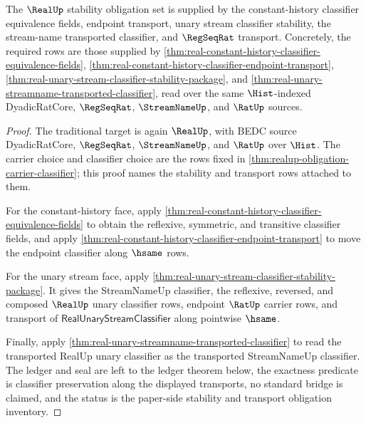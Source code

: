 \begin{theorem}
\label{thm:realup-obligation-stability-transport}
The $\RealUp$ stability obligation set is supplied by the
constant-history classifier equivalence fields, endpoint transport, unary
stream classifier stability, the stream-name transported classifier, and
$\RegSeqRat$ transport. Concretely, the required rows are those supplied by
\autoref{thm:real-constant-history-classifier-equivalence-fields},
\autoref{thm:real-constant-history-classifier-endpoint-transport},
\autoref{thm:real-unary-stream-classifier-stability-package}, and
\autoref{thm:real-unary-streamname-transported-classifier}, read over the
same $\Hist$-indexed DyadicRatCore, $\RegSeqRat$, $\StreamNameUp$, and
$\RatUp$ sources.
\end{theorem}
\begin{proof}
The traditional target is again $\RealUp$, with BEDC source
DyadicRatCore, $\RegSeqRat$, $\StreamNameUp$, and $\RatUp$ over $\Hist$.
The carrier choice and classifier choice are the rows fixed in
\autoref{thm:realup-obligation-carrier-classifier}; this proof names the
stability and transport rows attached to them.

For the constant-history face, apply
\autoref{thm:real-constant-history-classifier-equivalence-fields} to obtain
the reflexive, symmetric, and transitive classifier fields, and apply
\autoref{thm:real-constant-history-classifier-endpoint-transport} to move the
endpoint classifier along $\hsame$ rows.

For the unary stream face, apply
\autoref{thm:real-unary-stream-classifier-stability-package}. It gives the
StreamNameUp classifier, the reflexive, reversed, and composed
$\RealUp$ unary classifier rows, endpoint $\RatUp$ carrier rows, and
transport of $\mathsf{RealUnaryStreamClassifier}$ along pointwise $\hsame$.

Finally, apply
\autoref{thm:real-unary-streamname-transported-classifier} to read the
transported RealUp unary classifier as the transported StreamNameUp
classifier. The ledger and seal are left to the ledger theorem below, the
exactness predicate is classifier preservation along the displayed
transports, no standard bridge is claimed, and the status is the paper-side
stability and transport obligation inventory.
\end{proof}

